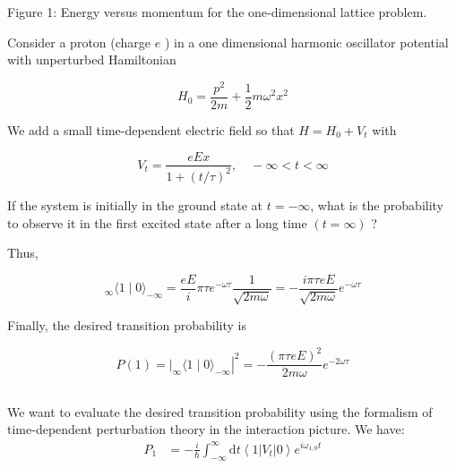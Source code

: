 \documentclass[12pt]{article}
\begin{document}
Figure 1: Energy versus momentum for the one-dimensional lattice problem.

Consider a proton (charge $e$ ) in a one dimensional harmonic oscillator potential with unperturbed Hamiltonian

$$
H_{0}=\frac{p^{2}}{2 m}+\frac{1}{2} m \omega^{2} x^{2}
$$

We add a small time-dependent electric field so that $H=H_{0}+V_{t}$ with

$$
V_{t}=\frac{e E x}{1+(t / \tau)^{2}}, \quad-\infty<t<\infty
$$

If the system is initially in the ground state at $t=-\infty$, what is the probability to observe it in the first excited state after a long time $(t=\infty)$ ?

Thus,

$$
{ }_{\infty}\langle 1 \mid 0\rangle_{-\infty}=\frac{e E}{i} \pi \tau e^{-\omega \tau} \frac{1}{\sqrt{2 m \omega}}=-\frac{i \pi \tau e E}{\sqrt{2 m \omega}} e^{-\omega \tau}
$$

Finally, the desired transition probability is

$$
P(1)=\left.\left.\right|_{\infty}\langle 1 \mid 0\rangle_{-\infty}\right|^{2}=-\frac{(\pi \tau e E)^{2}}{2 m \omega} e^{-2 \omega \tau}
$$
\subsection{}
We want to evaluate the desired transition probability using the formalism of time-dependent perturbation theory in the interaction picture. We have:
\begin{equation}
  \begin{aligned}
    P_{1} &= -\frac{i}{\hbar} \int_{-\infty}^{\infty} \mathrm{d} t\left\langle 1\left|V_{t}\right| 0\right\rangle e^{i \omega_{1, 0} t} \\
\end{aligned}
\end{equation}
\end{document}

